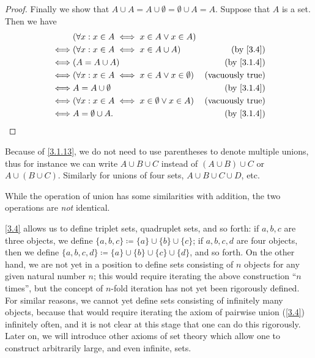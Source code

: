 \begin{proof}
  Finally we show that \(A \cup A = A \cup \emptyset = \emptyset \cup A = A\).
  Suppose that \(A\) is a set.
  Then we have
  \begin{align*}
         & (\forall x : x \in A \iff x \in A \lor x \in A)                                    \\
    \iff & (\forall x : x \in A \iff x \in A \cup A)               & \text{(by \cref{3.4})}   \\
    \iff & (A = A \cup A)                                          & \text{(by \cref{3.1.4})} \\
    \iff & (\forall x : x \in A \iff x \in A \lor x \in \emptyset) & \text{(vacuously true)}  \\
    \iff & A = A \cup \emptyset                                    & \text{(by \cref{3.1.4})} \\
    \iff & (\forall x : x \in A \iff x \in \emptyset \lor x \in A) & \text{(vacuously true)}  \\
    \iff & A = \emptyset \cup A.                                   & \text{(by \cref{3.1.4})}
  \end{align*}
\end{proof}

\begin{note}
  Because of \cref{3.1.13}, we do not need to use parentheses to denote multiple unions, thus for instance we can write \(A \cup B \cup C\) instead of \((A \cup B) \cup C\) or \(A \cup (B \cup C)\).
  Similarly for unions of four sets, \(A \cup B \cup C \cup D\), etc.
\end{note}

\begin{remark}\label{3.1.14}
  While the operation of union has some similarities with addition, the two operations are \emph{not} identical.
\end{remark}

\begin{note}
  \cref{3.4} allows us to define triplet sets, quadruplet sets, and so forth: if \(a, b, c\) are three objects, we define \(\{a, b, c\} \coloneqq \{a\} \cup \{b\} \cup \{c\}\);
  if \(a, b, c, d\) are four objects, then we define \(\{a, b, c, d\} \coloneqq \{a\} \cup \{b\} \cup \{c\} \cup \{d\}\), and so forth.
  On the other hand, we are not yet in a position to define sets consisting of \(n\) objects for any given natural number \(n\);
  this would require iterating the above construction ``\(n\) times'', but the concept of \(n\)-fold iteration has not yet been rigorously defined.
  For similar reasons, we cannot yet define sets consisting of infinitely many objects, because that would require iterating the axiom of pairwise union (\cref{3.4}) infinitely often, and it is not clear at this stage that one can do this rigorously.
  Later on, we will introduce other axioms of set theory which allow one to construct arbitrarily large, and even infinite, sets.
\end{note}


